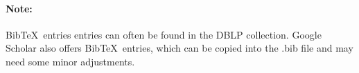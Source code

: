\documentclass[a4paper,12pt]{article}
\begin{document}
\paragraph*{Note:} Bib\TeX~entries entries can often be found in the DBLP collection. Google Scholar also offers Bib\TeX~entries, which can be copied into the .bib file and may need some minor adjustments.


\nolinenumbers
\footnotesize

\end{document}

